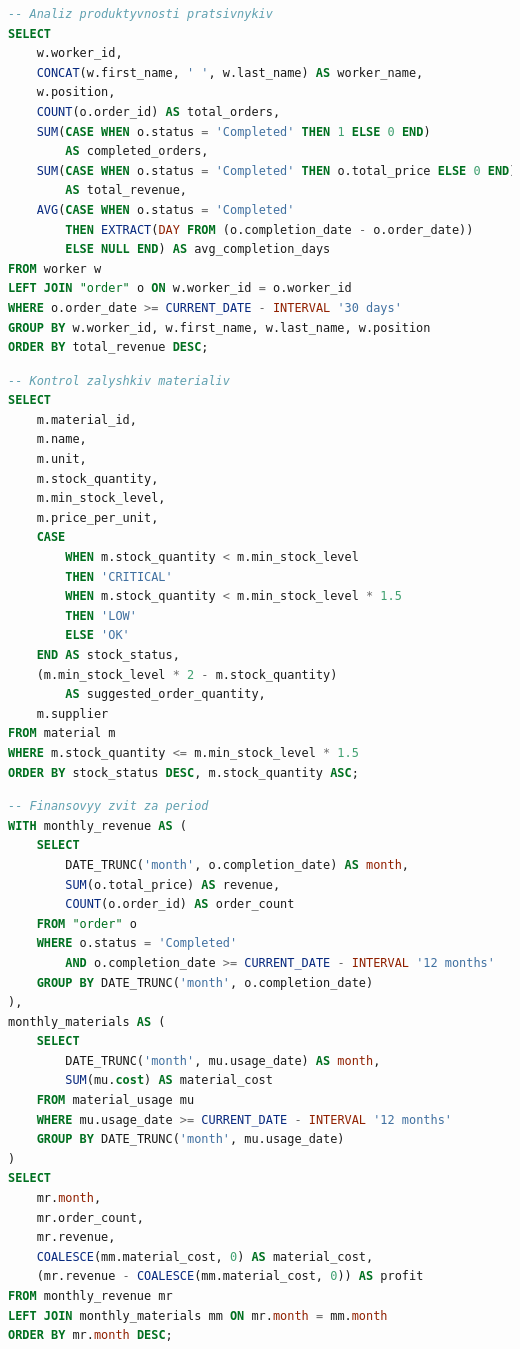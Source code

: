 \documentclass[14pt,a4paper]{extarticle}
\begin{document}
\begin{lstlisting}[language=SQL, caption=Запит для аналізу продуктивності працівників, basicstyle=\small\ttfamily, breaklines=true, frame=single]
-- Analiz produktyvnosti pratsivnykiv
SELECT 
    w.worker_id,
    CONCAT(w.first_name, ' ', w.last_name) AS worker_name,
    w.position,
    COUNT(o.order_id) AS total_orders,
    SUM(CASE WHEN o.status = 'Completed' THEN 1 ELSE 0 END) 
        AS completed_orders,
    SUM(CASE WHEN o.status = 'Completed' THEN o.total_price ELSE 0 END) 
        AS total_revenue,
    AVG(CASE WHEN o.status = 'Completed' 
        THEN EXTRACT(DAY FROM (o.completion_date - o.order_date)) 
        ELSE NULL END) AS avg_completion_days
FROM worker w
LEFT JOIN "order" o ON w.worker_id = o.worker_id
WHERE o.order_date >= CURRENT_DATE - INTERVAL '30 days'
GROUP BY w.worker_id, w.first_name, w.last_name, w.position
ORDER BY total_revenue DESC;
\end{lstlisting}

\newpage
\begin{lstlisting}[language=SQL, caption=Запит для контролю залишків матеріалів, basicstyle=\small\ttfamily, breaklines=true, frame=single]
-- Kontrol zalyshkiv materialiv
SELECT 
    m.material_id,
    m.name,
    m.unit,
    m.stock_quantity,
    m.min_stock_level,
    m.price_per_unit,
    CASE 
        WHEN m.stock_quantity < m.min_stock_level 
        THEN 'CRITICAL'
        WHEN m.stock_quantity < m.min_stock_level * 1.5 
        THEN 'LOW'
        ELSE 'OK'
    END AS stock_status,
    (m.min_stock_level * 2 - m.stock_quantity) 
        AS suggested_order_quantity,
    m.supplier
FROM material m
WHERE m.stock_quantity <= m.min_stock_level * 1.5
ORDER BY stock_status DESC, m.stock_quantity ASC;
\end{lstlisting}

\begin{lstlisting}[language=SQL, caption=Запит для фінансового звіту, basicstyle=\small\ttfamily, breaklines=true, frame=single]
-- Finansovyy zvit za period
WITH monthly_revenue AS (
    SELECT 
        DATE_TRUNC('month', o.completion_date) AS month,
        SUM(o.total_price) AS revenue,
        COUNT(o.order_id) AS order_count
    FROM "order" o
    WHERE o.status = 'Completed'
        AND o.completion_date >= CURRENT_DATE - INTERVAL '12 months'
    GROUP BY DATE_TRUNC('month', o.completion_date)
),
monthly_materials AS (
    SELECT 
        DATE_TRUNC('month', mu.usage_date) AS month,
        SUM(mu.cost) AS material_cost
    FROM material_usage mu
    WHERE mu.usage_date >= CURRENT_DATE - INTERVAL '12 months'
    GROUP BY DATE_TRUNC('month', mu.usage_date)
)
SELECT 
    mr.month,
    mr.order_count,
    mr.revenue,
    COALESCE(mm.material_cost, 0) AS material_cost,
    (mr.revenue - COALESCE(mm.material_cost, 0)) AS profit
FROM monthly_revenue mr
LEFT JOIN monthly_materials mm ON mr.month = mm.month
ORDER BY mr.month DESC;
\end{lstlisting}
\end{document}
